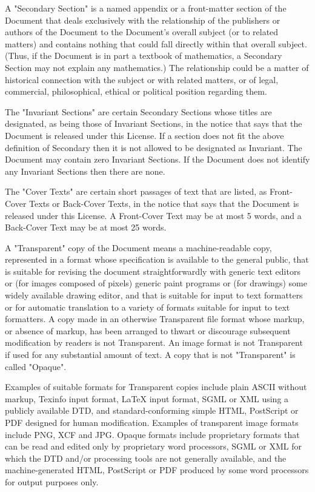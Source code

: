 \documentclass[oneside,english,a4paper,10pt,oneside,openany,final]{memoir}
\begin{document}
A "Secondary Section" is a named appendix or a front-matter section of the Document that deals exclusively with the relationship of the publishers or authors of the Document to the Document's overall subject (or to related matters) and contains nothing that could fall directly within that overall subject. (Thus, if the Document is in part a textbook of mathematics, a Secondary Section may not explain any mathematics.) The relationship could be a matter of historical connection with the subject or with related matters, or of legal, commercial, philosophical, ethical or political position regarding them.

The "Invariant Sections" are certain Secondary Sections whose titles are designated, as being those of Invariant Sections, in the notice that says that the Document is released under this License. If a section does not fit the above definition of Secondary then it is not allowed to be designated as Invariant. The Document may contain zero Invariant Sections. If the Document does not identify any Invariant Sections then there are none.

The "Cover Texts" are certain short passages of text that are listed, as Front-Cover Texts or Back-Cover Texts, in the notice that says that the Document is released under this License. A Front-Cover Text may be at most 5 words, and a Back-Cover Text may be at most 25 words.

A "Transparent" copy of the Document means a machine-readable copy, represented in a format whose specification is available to the general public, that is suitable for revising the document straightforwardly with generic text editors or (for images composed of pixels) generic paint programs or (for drawings) some widely available drawing editor, and that is suitable for input to text formatters or for automatic translation to a variety of formats suitable for input to text formatters. A copy made in an otherwise Transparent file format whose markup, or absence of markup, has been arranged to thwart or discourage subsequent modification by readers is not Transparent. An image format is not Transparent if used for any substantial amount of text. A copy that is not "Transparent" is called "Opaque".

Examples of suitable formats for Transparent copies include plain ASCII without markup, Texinfo input format, LaTeX input format, SGML or XML using a publicly available DTD, and standard-conforming simple HTML, PostScript or PDF designed for human modification. Examples of transparent image formats include PNG, XCF and JPG. Opaque formats include proprietary formats that can be read and edited only by proprietary word processors, SGML or XML for which the DTD and/or processing tools are not generally available, and the machine-generated HTML, PostScript or PDF produced by some word processors for output purposes only.
\end{document}
